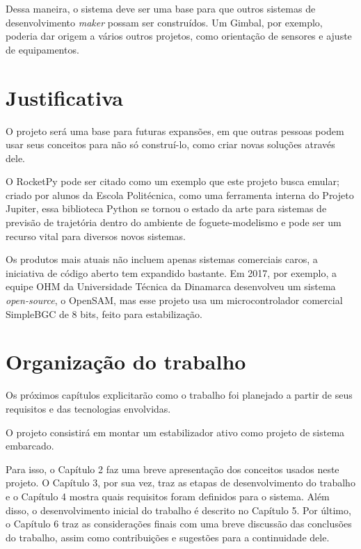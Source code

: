 Dessa maneira, o sistema deve ser uma base para que outros sistemas de desenvolvimento \textit{maker} possam ser construídos. Um Gimbal, por exemplo, poderia dar origem a vários outros projetos, como orientação de sensores e ajuste de equipamentos.


\section{Justificativa}

O projeto será uma base para futuras expansões, em que outras pessoas podem usar seus conceitos para não só construí-lo, como criar novas soluções através dele. 

O RocketPy\cite{RocketPy} pode ser citado como um exemplo que este projeto busca emular; criado por alunos da Escola Politécnica, como uma ferramenta interna do Projeto Jupiter, essa biblioteca Python se tornou o estado da arte para sistemas de previsão de trajetória dentro do ambiente de foguete-modelismo e pode ser um recurso vital para diversos novos sistemas.

Os produtos mais atuais não incluem apenas sistemas comerciais caros, a iniciativa de código aberto tem expandido bastante. Em 2017, por exemplo, a equipe OHM da Universidade Técnica da Dinamarca desenvolveu um sistema \textit{open-source}, o OpenSAM, mas esse projeto usa um microcontrolador comercial SimpleBGC de 8 bits, feito para estabilização\cite{open_sam}. 

\section{Organização do trabalho}
Os próximos capítulos explicitarão como o trabalho foi planejado a partir de seus requisitos e das tecnologias envolvidas.

O projeto consistirá em montar um estabilizador ativo como projeto de sistema embarcado.

Para isso, o Capítulo 2 faz uma breve apresentação dos conceitos usados neste projeto. O Capítulo 3, por sua vez, traz as etapas de desenvolvimento do trabalho e o Capítulo 4 mostra quais requisitos foram definidos para o sistema. Além disso, o desenvolvimento inicial do trabalho é descrito no Capítulo 5. Por último, o Capítulo 6 traz as considerações finais com uma breve discussão das conclusões do trabalho, assim como contribuições e sugestões para a continuidade dele.
